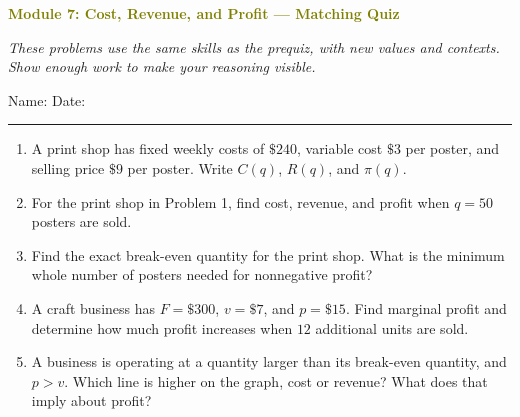 \documentclass[11pt]{article}
\newcommand{\quizhead}[2]{%
  \clearpage
  {\Large\bfseries\textcolor{olive}{Module #1: #2 — Matching Quiz}}\par
  \textit{These problems use the same skills as the prequiz, with new values and contexts. Show enough work to make your reasoning visible.}\par
  Name: \hspace{2.6in} Date: \hspace{1.1in}\par
  \vspace{2pt}\textcolor{gold}{\rule{\linewidth}{1.2pt}}\par\smallskip
}
\newcommand{\workmed}{\par\vspace{0.62in}}
\newcommand{\worklarge}{\par\vspace{0.92in}}
\begin{document}
\quizhead{7}{Cost, Revenue, and Profit}
\begin{enumerate}
\item A print shop has fixed weekly costs of \(\$240\), variable cost \(\$3\) per poster, and selling price \(\$9\) per poster. Write \(C(q)\), \(R(q)\), and \(\pi(q)\).
\worklarge

\item For the print shop in Problem 1, find cost, revenue, and profit when \(q=50\) posters are sold.
\worklarge

\item Find the exact break-even quantity for the print shop. What is the minimum whole number of posters needed for nonnegative profit?
\workmed

\item A craft business has \(F=\$300\), \(v=\$7\), and \(p=\$15\). Find marginal profit and determine how much profit increases when \(12\) additional units are sold.
\workmed

\item A business is operating at a quantity larger than its break-even quantity, and \(p>v\). Which line is higher on the graph, cost or revenue? What does that imply about profit?
\workmed
\end{enumerate}
\end{document}
